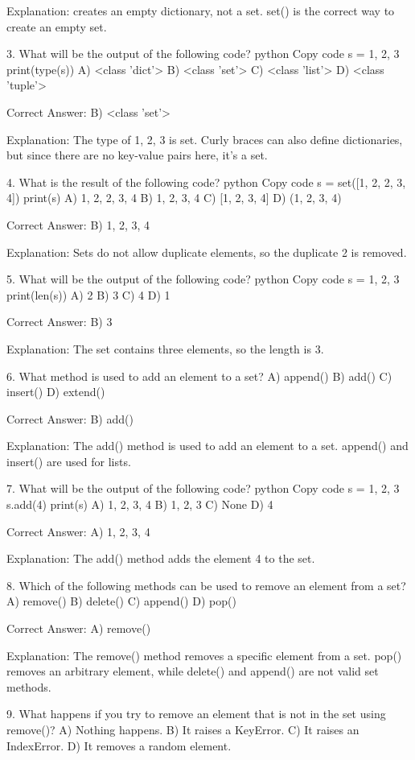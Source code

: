 Explanation:
{} creates an empty dictionary, not a set. set() is the correct way to create an empty set.

3. What will be the output of the following code?
python
Copy code
s = {1, 2, 3}
print(type(s))
A) <class 'dict'>
B) <class 'set'>
C) <class 'list'>
D) <class 'tuple'>

Correct Answer: B) <class 'set'>

Explanation:
The type of {1, 2, 3} is set. Curly braces can also define dictionaries, but since there are no key-value pairs here, it’s a set.

4. What is the result of the following code?
python
Copy code
s = set([1, 2, 2, 3, 4])
print(s)
A) {1, 2, 2, 3, 4}
B) {1, 2, 3, 4}
C) [1, 2, 3, 4]
D) (1, 2, 3, 4)

Correct Answer: B) {1, 2, 3, 4}

Explanation:
Sets do not allow duplicate elements, so the duplicate 2 is removed.

5. What will be the output of the following code?
python
Copy code
s = {1, 2, 3}
print(len(s))
A) 2
B) 3
C) 4
D) 1

Correct Answer: B) 3

Explanation:
The set contains three elements, so the length is 3.

6. What method is used to add an element to a set?
A) append()
B) add()
C) insert()
D) extend()

Correct Answer: B) add()

Explanation:
The add() method is used to add an element to a set. append() and insert() are used for lists.

7. What will be the output of the following code?
python
Copy code
s = {1, 2, 3}
s.add(4)
print(s)
A) {1, 2, 3, 4}
B) {1, 2, 3}
C) None
D) {4}

Correct Answer: A) {1, 2, 3, 4}

Explanation:
The add() method adds the element 4 to the set.

8. Which of the following methods can be used to remove an element from a set?
A) remove()
B) delete()
C) append()
D) pop()

Correct Answer: A) remove()

Explanation:
The remove() method removes a specific element from a set. pop() removes an arbitrary element, while delete() and append() are not valid set methods.

9. What happens if you try to remove an element that is not in the set using remove()?
A) Nothing happens.
B) It raises a KeyError.
C) It raises an IndexError.
D) It removes a random element.

